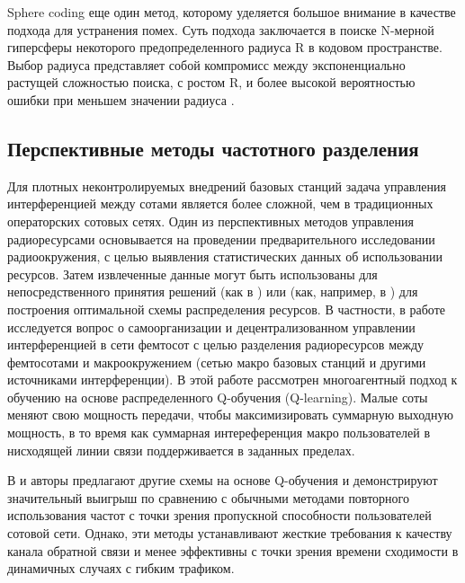 Sphere coding еще один метод, которому уделяется большое внимание в качестве подхода для устранения помех. Суть подхода заключается в поиске N-мерной гиперсферы некоторого предопределенного радиуса R в кодовом пространстве. Выбор радиуса представляет собой компромисс между экспоненциально растущей сложностью поиска, с ростом R, и более высокой вероятностью ошибки при меньшем значении радиуса \cite{barbero2007performance}.

\subsection{Перспективные методы частотного разделения}

Для плотных неконтролируемых внедрений базовых станций задача управления интерференцией между сотами является более сложной, чем в традиционных операторских сотовых сетях. Один из перспективных методов управления радиоресурсами основывается на проведении предварительного исследовании радиоокружения, с целью выявления статистических данных об использовании ресурсов. Затем извлеченные данные могут быть использованы для непосредственного принятия решений (как в \cite{mab}) или (как, например, в \cite{q-learning}) для построения оптимальной схемы распределения ресурсов. В частности, в работе~\cite{q-learning} исследуется вопрос о самоорганизации и децентрализованном управлении интерференцией в сети фемтосот с целью разделения радиоресурсов между фемтосотами и макроокружением (сетью макро базовых станций и другими источниками интерференции). В этой работе рассмотрен многоагентный подход к обучению на основе распределенного Q-обучения (Q-learning). Малые соты меняют свою мощность передачи, чтобы максимизировать суммарную выходную мощность, в то время как суммарная интереференция макро пользователей в нисходящей линии связи поддерживается в заданных пределах.

В \cite{mp-qlearning} и \cite{fzq-learning} авторы предлагают другие схемы на основе Q-обучения и демонстрируют значительный выигрыш по сравнению с обычными методами повторного использования частот с точки зрения пропускной способности пользователей сотовой сети. Однако, эти методы устанавливают жесткие требования к качеству канала обратной связи и менее эффективны с точки зрения времени сходимости в динамичных случаях с гибким трафиком. 

